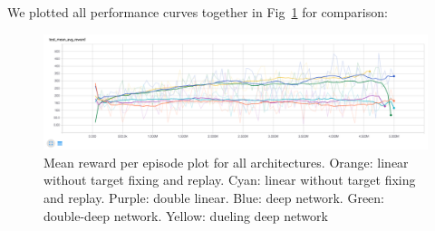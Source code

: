 \documentclass{article}
\begin{document}
We plotted all performance curves together in Fig~\ref{fig:r_all} for comparison:

\begin{figure}[h!] 
  \centering
  \label{fig:r_all}
  \includegraphics[width=1.0\textwidth]{images/r_all}
  \caption{Mean reward per episode plot for all architectures. Orange: linear without target fixing and replay. Cyan: linear without target fixing and replay. Purple: double linear. Blue: deep network. Green: double-deep network. Yellow: dueling deep network}
\end{figure}

\small
\medskip









\end{document}
